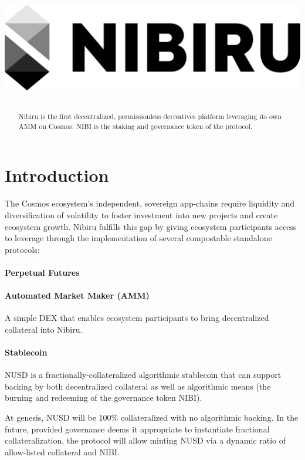 \documentclass[11pt]{article}
\title{
\begin{center}
 \includegraphics[scale=0.18]{nibi-logo-onwhite.png} 
\end{center} 
}
\begin{document}
\maketitle

\onecolumn
\begin{abstract}
Nibiru is the first decentralized, permissionless derivatives platform leveraging its own AMM on Cosmos. NIBI is the staking and  governance token of the protocol.
\end{abstract}

\part*{Introduction}
\label{Section1}


The Cosmos ecosystem's independent, sovereign app-chains require liquidity and
diversification of volatility to foster investment into new projects and create
ecosystem growth. Nibiru fulfills this gap by giving ecosystem participants access to leverage through the implementation of several compostable standalone protocols:

\subsection*{Perpetual Futures}

\subsection*{Automated Market Maker (AMM)} 
A simple DEX that enables ecosystem participants to bring decentralized
collateral into Nibiru.


\subsection*{Stablecoin} 
NUSD is a fractionally-collateralized algorithmic stablecoin that can support backing by both decentralized collateral as well as algorithmic means (the burning and redeeming of the governance token NIBI).

At genesis, NUSD will be 100\% collateralized with no algorithmic backing. In the future, provided governance deems it appropriate to instantiate fractional collateralization, the protocol will allow minting NUSD via a dynamic ratio of allow-listed collateral and NIBI.
\end{document}
